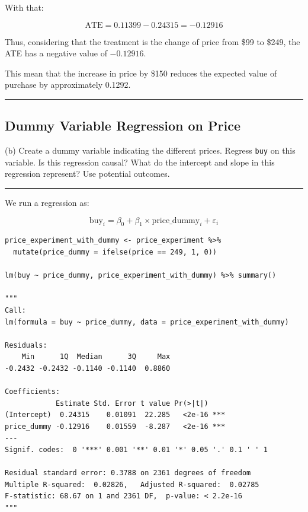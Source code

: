 \documentclass{article}
\newenvironment{colorparagraph}[1]{\par\color{#1}}{\par}
\begin{document}
With that:

$$
\text{ATE} = 0.11399 - 0.24315 = -0.12916
$$

Thus, considering that the treatment is the change of price from \$99 to \$249, the ATE has a negative value of $-0.12916$.

This mean that the increase in price by \$150 reduces the expected value of purchase by approximately 0.1292.

\newpage

\begin{colorparagraph}{questioncolor}
\rule{\textwidth}{0.5pt}

\label{q3b}\subsection{Dummy Variable Regression on Price}
(b) Create a dummy variable indicating the different prices. Regress \texttt{buy} on this variable. Is this regression causal? What do the intercept and slope in this regression represent? Use potential outcomes.

\rule{\textwidth}{0.5pt}
\end{colorparagraph}

We run a regression as:

$$
\text{buy}_i = \beta_0 + \beta_1 \times \text{price\_dummy}_i + \varepsilon_i
$$

\begin{lstlisting}[style=Rstyle, caption=Simple Regression with Dummy on Price Experiment]
price_experiment_with_dummy <- price_experiment %>% 
  mutate(price_dummy = ifelse(price == 249, 1, 0))

lm(buy ~ price_dummy, price_experiment_with_dummy) %>% summary()

"""
Call:
lm(formula = buy ~ price_dummy, data = price_experiment_with_dummy)

Residuals:
    Min      1Q  Median      3Q     Max 
-0.2432 -0.2432 -0.1140 -0.1140  0.8860 

Coefficients:
            Estimate Std. Error t value Pr(>|t|)    
(Intercept)  0.24315    0.01091  22.285   <2e-16 ***
price_dummy -0.12916    0.01559  -8.287   <2e-16 ***
---
Signif. codes:  0 '***' 0.001 '**' 0.01 '*' 0.05 '.' 0.1 ' ' 1

Residual standard error: 0.3788 on 2361 degrees of freedom
Multiple R-squared:  0.02826,	Adjusted R-squared:  0.02785 
F-statistic: 68.67 on 1 and 2361 DF,  p-value: < 2.2e-16
"""
\end{lstlisting}
\end{document}

